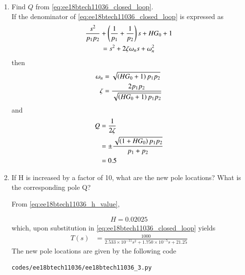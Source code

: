 \begin{enumerate}[label=\arabic*.,ref=\theenumi]
\item Find $Q$ from      \eqref{eq:ee18btech11036_closed_loop}.
\\
\solution  If the denominator of \eqref{eq:ee18btech11036_closed_loop} is expressed as
%
\begin{multline}
\frac{s^2}{p_1p_2} + \left(\frac{1}{p_1}+\frac{1}{p_2}\right)s + HG_0+1 
\\
= s^2+2\zeta\omega_ns+\omega_n^{2} \label{eq:ee18btech11036_second_order_ce}
\end{multline}
then 
\begin{align}
    \omega_n &= {\sqrt{\left(HG_0+1\right)p_1p_2}}\\
    \zeta &= {\frac{2p_1p_2}{\sqrt{\left(HG_0+1\right)p_1p_2}}}
\end{align}
and 
\begin{align}
    Q &= \frac{1}{2\zeta}
%
\\
     &= \pm{\frac{\sqrt{\brak{1+HG_0}p_1p_2}}{p_1+p_2}} \label{eq:ee18btech11036_Q}
\\
     &= 0.5
\end{align}
\item If  H  is  increased  by  a  factor  of  10,  what are the new pole locations? What is the corresponding pole Q?\\
\begin{table}[!ht]
\centering

\caption{}
\label{table:ee18btech11036_ out_Table}
\end{table}

\solution  From     \eqref{eq:ee18btech11036_h_value},

\begin{align}
     H=0.02025
     \label{eq:ee18btech11036_new_h}
\end{align}
which, upon substitution in  \ref{eq:ee18btech11036_closed_loop} yields
%
\begin{align}
    T(s) &= \frac{1000}{2.533 \times 10^{-11}s^2+1.750 \times 10^{-5}s+21.25}
    \label{eq:ee18btech11036_Transfer_func_2}
\end{align}
The new pole locations are given by the following code
\begin{lstlisting}
codes/ee18btech11036/ee18btech11036_3.py
\end{lstlisting}


\end{enumerate}
